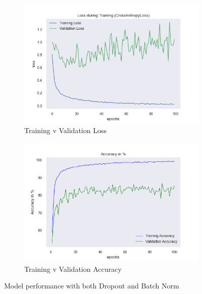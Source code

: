 \documentclass[a4paper]{article}
\begin{document}
\begin{figure}[H]
\centering
\begin{subfigure}{0.5\textwidth}
  \centering
  \includegraphics[width=1\linewidth]{img/baptiste/baptiste_100epoches_val_loss__Dropouts_True__BatchNorm_True.png}
  \caption{Training v Validation Loss}
  \label{fig:sub1}
\end{subfigure}%
\begin{subfigure}{0.5\textwidth}
  \centering
  \includegraphics[width=1\linewidth]{img/baptiste/baptiste_100epoches_train_accuracy__Dropouts_True__BatchNorm_True.png}
  \caption{Training v Validation Accuracy}
  \label{fig:sub2}
\end{subfigure}
\caption{Model performance with both Dropout and Batch Norm}
\label{fig:test}
\end{figure}
\end{document}
